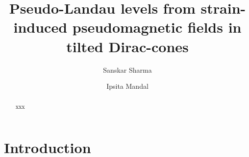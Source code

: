 \documentclass[aps,prb, onecolumn,nofootinbib,citeautoscript,10pt]{revtex4-2}
\begin{document}
\title{Pseudo-Landau levels from strain-induced pseudomagnetic fields in tilted Dirac-cones}



\author{Sanskar Sharma}
\author{Ipsita Mandal}




\begin{abstract}
xxx
\end{abstract}


\maketitle

\tableofcontents



\section{Introduction}
\end{document}
